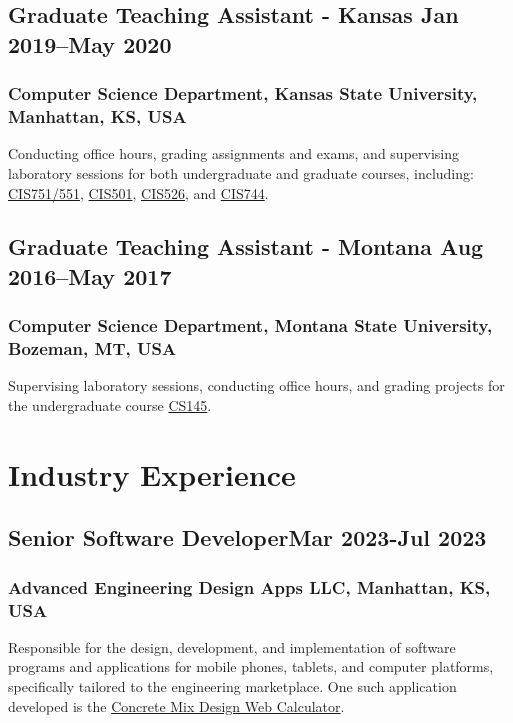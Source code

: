 \documentclass[11pt]{article}
\begin{document}
\vspace{0.8em} %


\subsection{Graduate Teaching Assistant - Kansas \hfill \normalfont Jan 2019–May 2020 }  
\subsubsection{Computer Science Department, Kansas State University,  Manhattan, KS, USA}
 \noindent
Conducting office hours, grading assignments and exams, and supervising laboratory sessions for both undergraduate and graduate courses, including: \hyperref[sec: CIS751/551]{CIS751/551}, \hyperref[sec: CIS501]{CIS501}, \hyperref[sec: CIS526]{CIS526}, and \hyperref[sec: CIS744]{CIS744}. 



\vspace{0.8em} %

\subsection{Graduate Teaching Assistant - Montana \hfill \normalfont Aug 2016–May 2017 }  
\subsubsection{Computer Science Department, Montana State University,  Bozeman, MT, USA}
 \noindent
Supervising laboratory sessions, conducting office hours, and grading projects for the undergraduate course \hyperref[sec: CS145]{CS145}. 

\vspace{0.8em} %




\section{Industry Experience}
\subsection{Senior Software Developer\hfill \normalfont Mar 2023-Jul 2023}  
\subsubsection{Advanced Engineering Design Apps LLC, Manhattan, KS, USA}
 \noindent
Responsible for the design, development, and implementation of software programs and applications for mobile phones, tablets, and computer platforms, specifically tailored to the engineering marketplace. One such application developed is the \hyperref[sec: MixDesign]{Concrete Mix Design Web Calculator}.
     
\end{document}

